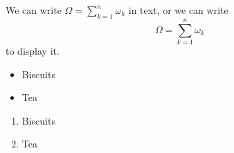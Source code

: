 \documentclass[a4paper,12pt]{article}
\begin{document}
We can write
$ \Omega = \sum_{k=1}^{n} \omega_k $
in text, or we can write
\begin{equation}
\Omega = \sum_{k=1}^{n} \omega_k
\end{equation}
to display it.

\begin{itemize}
\item Biscuits
\item Tea
\end{itemize}
\begin{enumerate}
\item Biscuits
\item Tea
\end{enumerate}
\end{document}
